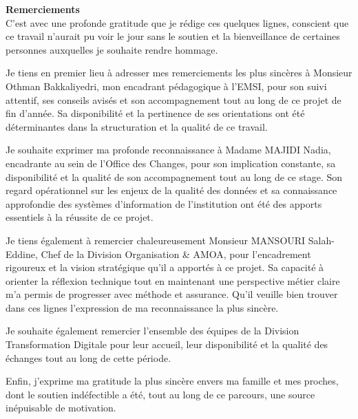 \clearpage
{}

\vspace*{\fill}

\noindent
\textbf{\LARGE Remerciements} \\[0.5cm]

C'est avec une profonde gratitude que je rédige ces quelques lignes, conscient que ce travail n'aurait pu voir le jour sans le soutien et la bienveillance de certaines personnes auxquelles je souhaite rendre hommage.

Je tiens en premier lieu à adresser mes remerciements les plus sincères à Monsieur Othman Bakkaliyedri, mon encadrant pédagogique à l'EMSI, pour son suivi attentif, ses conseils avisés et son accompagnement tout au long de ce projet de fin d'année. Sa disponibilité et la pertinence de ses orientations ont été déterminantes dans la structuration et la qualité de ce travail.

Je souhaite exprimer ma profonde reconnaissance à Madame MAJIDI Nadia, encadrante au sein de l'Office des Changes, pour son implication constante, sa disponibilité et la qualité de son accompagnement tout au long de ce stage. Son regard opérationnel sur les enjeux de la qualité des données et sa connaissance approfondie des systèmes d'information de l'institution ont été des apports essentiels à la réussite de ce projet.

Je tiens également à remercier chaleureusement Monsieur MANSOURI Salah-Eddine, Chef de la Division Organisation \& AMOA, pour l'encadrement rigoureux et la vision stratégique qu'il a apportés à ce projet. Sa capacité à orienter la réflexion technique tout en maintenant une perspective métier claire m'a permis de progresser avec méthode et assurance. Qu'il veuille bien trouver dans ces lignes l'expression de ma reconnaissance la plus sincère.

Je souhaite également remercier l'ensemble des équipes de la Division Transformation Digitale pour leur accueil, leur disponibilité et la qualité des échanges tout au long de cette période.

Enfin, j'exprime ma gratitude la plus sincère envers ma famille et mes proches, dont le soutien indéfectible a été, tout au long de ce parcours, une source inépuisable de motivation.

\vspace*{\fill}
